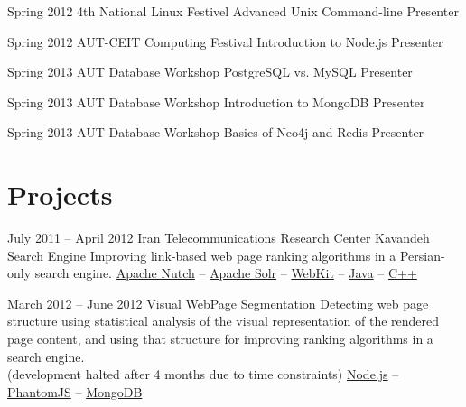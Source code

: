 \documentclass{tccv}
\begin{document}
{{\begin{teaching}
\item{Spring 2012}
	 {4th National Linux Festivel}
	 {Advanced Unix Command-line}
	 {Presenter}


\item{Spring 2012}
	 {AUT-CEIT Computing Festival}
	 {Introduction to Node.js}
	 {Presenter}


\item{Spring 2013}
	 {AUT Database Workshop}
	 {PostgreSQL vs. MySQL}
	 {Presenter}


\item{Spring 2013}
	 {AUT Database Workshop}
	 {Introduction to MongoDB}
	 {Presenter}


\item{Spring 2013}
	 {AUT Database Workshop}
	 {Basics of Neo4j and Redis}
	 {Presenter}

\end{teaching}










\section{Projects}

\begin{project_list}

\item{July 2011 -- April 2012}
     {Iran Telecommunications Research Center}
     {Kavandeh Search Engine}
	 {Improving link-based web page ranking algorithms in a Persian-only search engine.}
     {
     	\href{http://nutch.apache.org}{Apache Nutch} -- 
		\href{http://lucene.apache.org/solr/}{Apache Solr} -- 
		\href{http://www.webkit.org}{WebKit} -- 
		\href{http://www.oracle.com/technetwork/java/}{Java} -- 
		\href{https://en.wikipedia.org/wiki/C\%2B\%2B}{C++}
	}

\vspace{5px}

\item{March 2012 -- June 2012}
     {}
     {Visual WebPage Segmentation}
	 {Detecting web page structure using statistical analysis of the visual representation of the rendered page content, and using that structure for improving ranking algorithms in a search engine.\\
(development halted after 4 months due to time constraints)}
	 {
	 	\href{http://nodejs.org}{Node.js} -- 
		\href{http://phantomjs.org}{PhantomJS} -- 
		\href{http://www.mongodb.org}{MongoDB}
	 }



\end{project_list}}}
\end{document}
